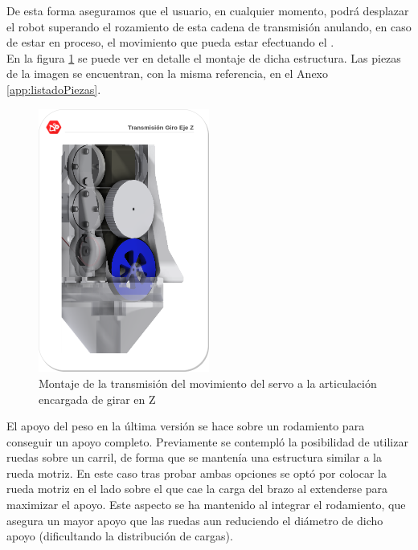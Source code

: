     De esta forma aseguramos que el usuario, en cualquier momento, podrá desplazar el robot superando el rozamiento de esta cadena de transmisión anulando, en caso de estar en proceso, el movimiento que pueda estar efectuando el .
	\\
	En la figura \ref{fig:Mecanica:giro_z} se puede ver en detalle el montaje de dicha estructura. Las piezas de la imagen se encuentran, con la misma referencia, en el Anexo \ref{app:listadoPiezas}.

	\begin{figure}[H]
		\centering
		\includegraphics[width=0.5\textwidth]{figuras/Imagenes_Mecanica/RuedasGiroZ.png}
		\caption{Montaje de la transmisión del movimiento del servo a la articulación encargada de girar en Z}
		\label{fig:Mecanica:giro_z}
	\end{figure}

	El apoyo del peso en la última versión se hace sobre un rodamiento  para conseguir un apoyo completo. Previamente se contempló la posibilidad de utilizar ruedas sobre un carril, de forma que se mantenía una estructura similar a la rueda motriz. En este caso tras probar ambas opciones se optó por colocar la rueda motriz en el lado sobre el que cae la carga del brazo al extenderse para maximizar el apoyo. Este aspecto se ha mantenido al integrar el rodamiento, que asegura un mayor apoyo que las ruedas aun reduciendo el diámetro de dicho apoyo (dificultando la distribución de cargas).


